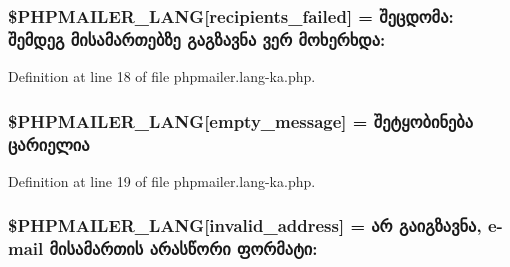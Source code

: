 \subsubsection[{\texorpdfstring{\$\+P\+H\+P\+M\+A\+I\+L\+E\+R\+\_\+\+L\+A\+NG}{$PHPMAILER_LANG}}]{\setlength{\rightskip}{0pt plus 5cm}\$P\+H\+P\+M\+A\+I\+L\+E\+R\+\_\+\+L\+A\+NG\mbox{[}\textquotesingle{}recipients\+\_\+failed\textquotesingle{}\mbox{]} =  შეცდომა\+: შემდეგ მისამართებზე გაგზავნა ვერ მოხერხდა\+: \textquotesingle{}}\hypertarget{phpmailer_8lang-ka_8php_a7589d30bb9b368327c2df015f3e6bcba}{}\label{phpmailer_8lang-ka_8php_a7589d30bb9b368327c2df015f3e6bcba}


Definition at line 18 of file phpmailer.\+lang-\/ka.\+php.

\subsubsection[{\texorpdfstring{\$\+P\+H\+P\+M\+A\+I\+L\+E\+R\+\_\+\+L\+A\+NG}{$PHPMAILER_LANG}}]{\setlength{\rightskip}{0pt plus 5cm}\$P\+H\+P\+M\+A\+I\+L\+E\+R\+\_\+\+L\+A\+NG\mbox{[}\textquotesingle{}empty\+\_\+message\textquotesingle{}\mbox{]} = \textquotesingle{}შეტყობინება ცარიელია\textquotesingle{}}\hypertarget{phpmailer_8lang-ka_8php_a33772099f637c9d6c2cd7425e0e37fed}{}\label{phpmailer_8lang-ka_8php_a33772099f637c9d6c2cd7425e0e37fed}


Definition at line 19 of file phpmailer.\+lang-\/ka.\+php.

\subsubsection[{\texorpdfstring{\$\+P\+H\+P\+M\+A\+I\+L\+E\+R\+\_\+\+L\+A\+NG}{$PHPMAILER_LANG}}]{\setlength{\rightskip}{0pt plus 5cm}\$P\+H\+P\+M\+A\+I\+L\+E\+R\+\_\+\+L\+A\+NG\mbox{[}\textquotesingle{}invalid\+\_\+address\textquotesingle{}\mbox{]} = \textquotesingle{}არ გაიგზავნა, {\bf e}-\/mail მისამართის არასწორი ფორმატი\+: \textquotesingle{}}\hypertarget{phpmailer_8lang-ka_8php_a42d61bcea4c79599ecb44fd062f54d47}{}\label{phpmailer_8lang-ka_8php_a42d61bcea4c79599ecb44fd062f54d47}


